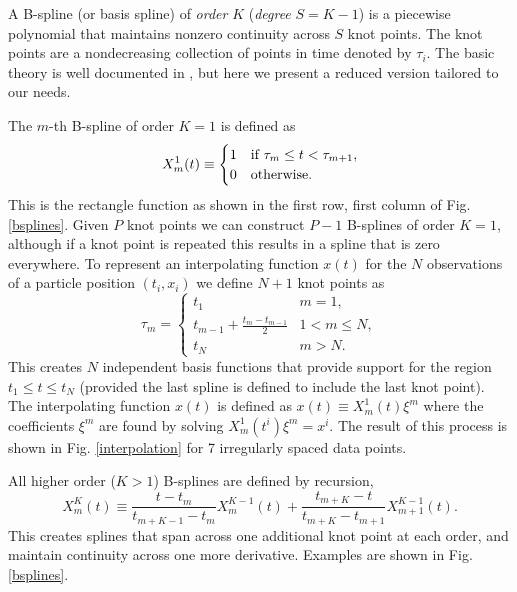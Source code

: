 \documentclass{ametsoc}
\begin{document}
A B-spline (or basis spline) of \emph{order} $K$ (\emph{degree} $S=K-1$) is a piecewise polynomial that maintains nonzero continuity across $S$ knot points. The knot points are a nondecreasing collection of points in time denoted by $\tau_i$. The basic theory is well documented in \citet{deboor1978-book}, but here we present a reduced version tailored to our needs.

The $m$-th B-spline of order $K=1$ is defined as
\begin{equation}
X^1_m(t) \equiv \begin{cases}
1      & \text{if $ \tau_m \leq t < \tau_{m+1}$}, \\
0     & \text{otherwise}.
\end{cases}
\end{equation}
This is the rectangle function as shown in the first row, first column of Fig. \ref{bsplines}. Given $P$ knot points we can construct $P-1$ B-splines of order $K=1$, although if a knot point is repeated this results in a spline that is zero everywhere. To represent an interpolating function $x(t)$ for the $N$ observations of a particle position $(t_i,x_i)$ we define $N+1$ knot points as
\begin{equation}
\tau_m = \begin{cases}
t_1      & \text{$m=1$}, \\
t_{m-1} + \frac{t_m-t_{m-1}}{2}	  & \text{$1<m \leq N$},\\
t_N     & \text{$m>N$}.
\end{cases}
\end{equation}
This creates $N$ independent basis functions that provide support for the region $t_1 \leq t \leq t_N$ (provided the last spline is defined to include the last knot point). The interpolating function $x(t)$ is defined as $x(t) \equiv  X^1_m(t) \xi^m$ where the coefficients $\xi^m$ are found by solving $X^1_m(t^i) \xi^m = x^i$. The result of this process is shown in Fig. \ref{interpolation} for 7 irregularly spaced data points.

All higher order ($K>1$) B-splines are defined by recursion,
\begin{equation}
X^K_m(t) \equiv \frac{t - t_m}{t_{m+K-1} - t_m} X^{K-1}_m(t) + \frac{t_{m+K}-t}{t_{m+K} - t_{m+1}} X^{K-1}_{m+1}(t).
\end{equation}
This creates splines that span across one additional knot point at each order, and maintain continuity across one more derivative. Examples are shown in Fig. \ref{bsplines}.
\end{document}
